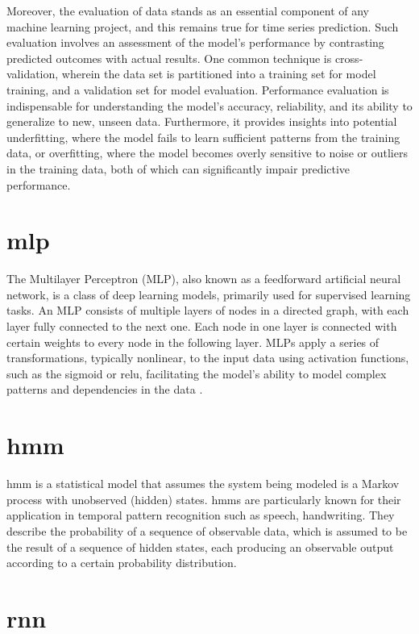 Moreover, the evaluation of data stands as an essential component of any machine learning project, and this remains true for time series prediction.
Such evaluation involves an assessment of the model's performance by contrasting predicted outcomes with actual results.
One common technique is cross-validation, wherein the data set is partitioned into a training set for model training, and a validation set for model evaluation.
Performance evaluation is indispensable for understanding the model's accuracy, reliability, and its ability to generalize to new, unseen data.
Furthermore, it provides insights into potential underfitting, where the model fails to learn sufficient patterns from the training data, or overfitting, where the model becomes overly sensitive to noise or outliers in the training data, both of which can significantly impair predictive performance.

\section{\ac{mlp}}

The Multilayer Perceptron (MLP), also known as a feedforward artificial neural network, is a class of deep learning models, primarily used for supervised learning tasks.
An MLP consists of multiple layers of nodes in a directed graph, with each layer fully connected to the next one.
Each node in one layer is connected with certain weights to every node in the following layer.
MLPs apply a series of transformations, typically nonlinear, to the input data using activation functions, such as the sigmoid or \ac{relu}, facilitating the model's ability to model complex patterns and dependencies in the data \cite{goodfellow_deep_2016}.

\section{\ac{hmm}}

\ac{hmm} is a statistical model that assumes the system being modeled is a Markov process with unobserved (hidden) states\cite{hmm-rabiner-1989}.
\acp{hmm} are particularly known for their application in temporal pattern recognition such as speech, handwriting.
They describe the probability of a sequence of observable data, which is assumed to be the result of a sequence of hidden states, each producing an observable output according to a certain probability distribution.

\section{\ac{rnn}}

